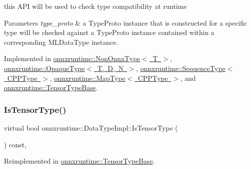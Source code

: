 this A\+PI will be used to check type compatibility at runtime 


\begin{DoxyParams}{Parameters}
{\em type\+\_\+proto} & a Type\+Proto instance that is constructed for a specific type will be checked against a Type\+Proto instance contained within a corresponding M\+L\+Data\+Type instance. \\
\hline
\end{DoxyParams}


Implemented in \mbox{\hyperlink{classonnxruntime_1_1NonOnnxType_a85fcf77182e033f38fe91c8845bb5aec}{onnxruntime\+::\+Non\+Onnx\+Type$<$ T $>$}}, \mbox{\hyperlink{classonnxruntime_1_1OpaqueType_a86b093877581257e6692e3028ebec5e5}{onnxruntime\+::\+Opaque\+Type$<$ T, D, N $>$}}, \mbox{\hyperlink{classonnxruntime_1_1SequenceType_afb9213564cca50fa7ad862aea0bca547}{onnxruntime\+::\+Sequence\+Type$<$ C\+P\+P\+Type $>$}}, \mbox{\hyperlink{classonnxruntime_1_1MapType_a4f5bf9ba0f295628b585909bdeaea30c}{onnxruntime\+::\+Map\+Type$<$ C\+P\+P\+Type $>$}}, and \mbox{\hyperlink{classonnxruntime_1_1TensorTypeBase_a24c6755da5656503337ec14e9a4ebbf8}{onnxruntime\+::\+Tensor\+Type\+Base}}.

\mbox{\label{classonnxruntime_1_1DataTypeImpl_a9503fa09405fee812516567ebe7711a2}} 
\subsubsection{\texorpdfstring{Is\+Tensor\+Type()}{IsTensorType()}}
{\footnotesize\ttfamily virtual bool onnxruntime\+::\+Data\+Type\+Impl\+::\+Is\+Tensor\+Type (\begin{DoxyParamCaption}{ }\end{DoxyParamCaption}) const\hspace{0.3cm}{\ttfamily [inline]}, {\ttfamily [virtual]}}



Reimplemented in \mbox{\hyperlink{classonnxruntime_1_1TensorTypeBase_aca50ccc834e19c0e5e8bf15ecdaa7711}{onnxruntime\+::\+Tensor\+Type\+Base}}.

\mbox{\label{classonnxruntime_1_1DataTypeImpl_ad3176e13a636bae69d7459e7787a0750}} 
